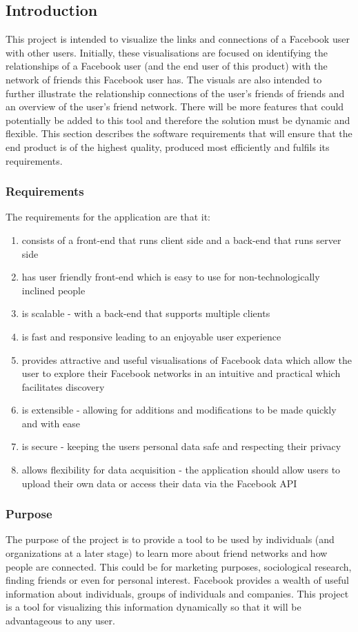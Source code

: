 \documentclass[12pt,onecolumn]{article}
\begin{document}
	\subsection{Introduction}
	This project is intended to visualize the links and connections of a Facebook user with other users. Initially, these visualisations are focused on identifying the relationships of a Facebook user (and the end user of this product) with the network of friends this Facebook user has. The visuals are also intended to further illustrate the relationship connections of the user's friends of friends and an overview of the user's friend network. There will be more features that could potentially be added to this tool and therefore the solution must be dynamic and flexible. This section describes the software requirements that will ensure that the end product is of the highest quality, produced most efficiently and fulfils its requirements.

	\subsubsection{Requirements}

	The requirements for the application are that it:
	\begin{enumerate}
	\item consists of a front-end that runs client side and a back-end that runs server side 
	\item has user friendly front-end which is easy to use for non-technologically inclined people
	\item is scalable - with a back-end that supports multiple clients
	\item is fast and responsive leading to an enjoyable user experience
	\item provides attractive and useful visualisations of Facebook data which allow the user to explore their Facebook networks in an intuitive and practical which facilitates discovery
	\item is extensible - allowing for additions and modifications to be made quickly and with ease
	\item is secure - keeping the users personal data safe and respecting their privacy
	\item allows flexibility for data acquisition - the application should allow users to upload their own data or access their data via the Facebook API
	\end{enumerate}

	\subsubsection{Purpose}
	The purpose of the project is to provide a tool to be used by individuals (and organizations at a later stage) to learn more about friend networks and how people are connected. This could be for marketing purposes, sociological research, finding friends or even for personal  interest. Facebook provides a wealth of useful information about individuals, groups of individuals and companies. This project is a tool for visualizing this information dynamically so that it will be advantageous to any  user.
\end{document}
